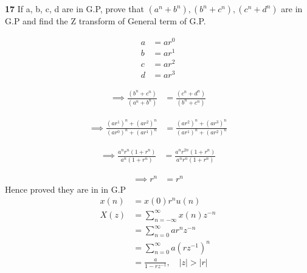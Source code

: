 \documentclass[journal,12pt,twocolumn]{IEEEtran}
\theoremstyle{remark}
\begin{document}


\vspace{3cm}

\title{}
\author{EE23BTECH11047 - Deepakreddy P
}
\maketitle
\newpage
\bigskip

\noindent \textbf{17} \quad 
If a, b, c, d are in G.P, prove that 
$ (a^{n} + b^{n}),(b^{n} + c^{n}),(c^{n} + d^{n}) $ are in G.P and find the Z transform of General term of G.P.\\
\solution

\begin{align}   
a &= ar^{0}\\
b &= ar^{1}\\
c &= ar^{2}\\
d &= ar^{3}
\end{align}

\begin{align} \implies \frac{(b^n + c^n)}{(a^n + b^n)} &= \frac{(c^n + d^n)}{(b^n + c^n)} \end{align}

\begin{align} \implies \frac{(ar^1)^n + (ar^2)^n}{(ar^0)^n + (ar^1)^n}  &= \frac{(ar^2)^n + (ar^3)^n}{(ar^1)^n + (ar^2)^n} \end{align}

\begin{align} \implies \frac{a^n r^n(1 + r^n)}{a^n(1 + r^n)} &= \frac{a^n r^{2n}(1 + r^n)}{a^n r^n (1 + r^n)} \end{align}

\begin{align} \implies r^n &= r^n \end{align}
Hence proved they are in in G.P
\begin{align}
    x(n) &= x(0)r^{n} u(n)\\
    X(z) &= \sum_{n=-\infty}^{\infty} {x(n) z^{-n}}\\
    &= \sum_{n=0}^{\infty} {ar^{n} z^{-n}}\\
    &= \sum_{n=0}^{\infty} {a (rz^{-1})^{n}}\\
    &= \frac{a}{1-rz^{-1}}, \quad |z|>|r|
\end{align}
\end{document}

